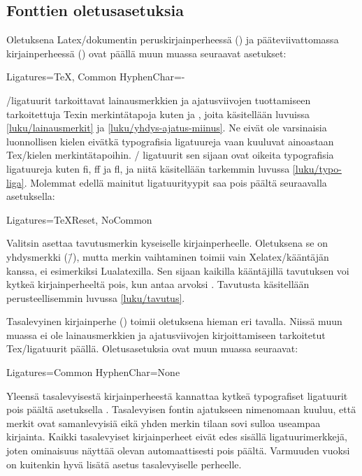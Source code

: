 \subsection{Fonttien oletusasetuksia}
\label{luku/fontit-oletusasetukset}

Oletuksena Latex\-/dokumentin peruskirjainperheessä
() ja pääteviivattomassa kirjainperheessä
() ovat päällä muun muassa seuraavat asetukset:%

\begin{koodilohkosis}
Ligatures={TeX, Common}
HyphenChar=-
\end{koodilohkosis}

\noindent
{}\-/ligatuurit tarkoittavat lainausmerkkien ja ajatusviivojen
tuottamiseen tarkoitettuja Texin merkintätapoja kuten  ja
\koodi{\==}, joita käsitellään luvuissa \ref{luku/lainausmerkit} ja
\ref{luku/yhdys-ajatus-miinus}. Ne eivät ole varsinaisia luonnollisen
kielen eivätkä typografisia ligatuureja vaan kuuluvat ainoastaan
Tex\-/kielen merkintätapoihin. \-/ ligatuurit sen sijaan
ovat oikeita typografisia ligatuureja kuten fi, ff ja fl, ja niitä
käsitellään tarkemmin luvussa \ref{luku/typo-liga}. Molemmat edellä
mainitut ligatuurityypit saa pois päältä seuraavalla asetuksella:

\begin{koodilohkosis}
Ligatures={TeXReset, NoCommon}
\end{koodilohkosis}

\noindent
Valitsin  asettaa tavutusmerkin kyseiselle
kirjainperheelle. Oletuksena se on yhdysmerkki (\=/), mutta merkin
vaihtaminen toimii vain Xelatex\-/kääntäjän kanssa, ei esimerkiksi
Lualatexilla. Sen sijaan kaikilla kääntäjillä tavutuksen voi kytkeä
kirjainperheeltä pois, kun antaa arvoksi . Tavutusta
käsitellään perusteellisemmin luvussa \ref{luku/tavutus}.

Tasalevyinen kirjainperhe () toimii oletuksena
hieman eri tavalla. Niissä muun muassa ei ole lainausmerkkien ja
ajatusviivojen kirjoittamiseen tarkoitetut Tex\-/ligatuurit päällä.
Oletusasetuksia ovat muun muassa seuraavat:

\begin{koodilohkosis}
Ligatures=Common
HyphenChar=None
\end{koodilohkosis}

\noindent
Yleensä tasalevyisestä kirjainperheestä kannattaa kytkeä typografiset
ligatuurit pois päältä asetuksella .
Tasalevyisen fontin ajatukseen nimenomaan kuuluu, että merkit ovat
samanlevyisiä eikä yhden merkin tilaan sovi sulloa useampaa kirjainta.
Kaikki tasalevyiset kirjainperheet eivät edes sisällä ligatuurimerkkejä,
joten ominaisuus näyttää olevan automaattisesti pois päältä. Varmuuden
vuoksi on kuitenkin hyvä lisätä asetus  tasalevyiselle perheelle.

